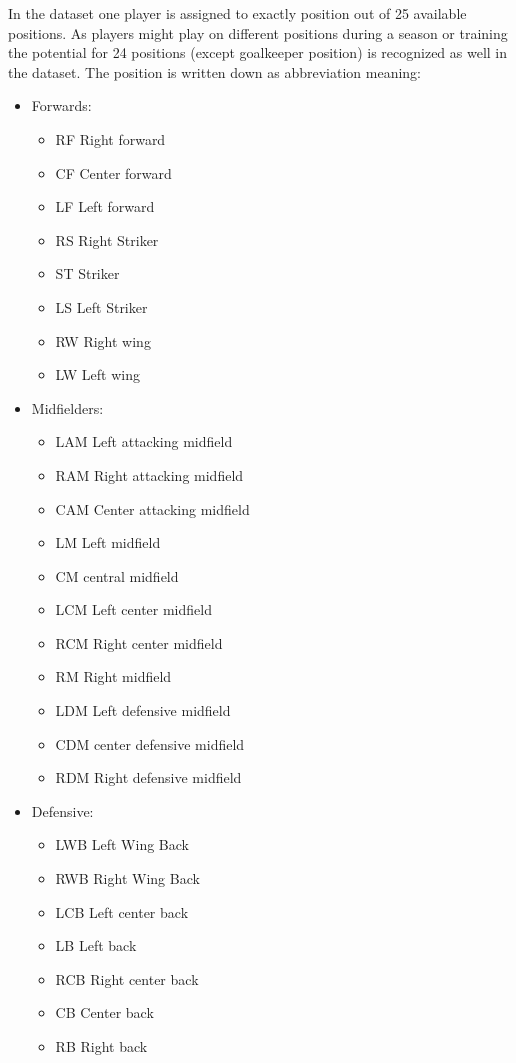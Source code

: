 In the dataset one player is assigned to exactly position out of 25 available positions. As players might play on different positions during a season or training the potential for 24 positions (except goalkeeper position) is recognized as well in the dataset. The position is written down as abbreviation meaning:
\setlength{\columnseprule}{0.4pt}
\begin{multicols}{3}
\begin{itemize}
\item	Forwards:
\begin{itemize}
\item	RF Right forward
\item	CF Center forward
\item	LF Left forward
\item	RS Right Striker
\item	ST Striker
\item	LS Left Striker
\item	RW Right wing
\item	LW Left wing 
\end{itemize}
\item	Midfielders:
\begin{itemize}
\item	LAM Left attacking midfield
\item	RAM Right attacking midfield
\item	CAM Center attacking midfield
\item	LM Left midfield
\item	CM central midfield
\item	LCM Left center midfield
\item	RCM Right center midfield
\item	RM Right midfield
\item	LDM Left defensive midfield
\item	CDM center defensive midfield
\item	RDM Right defensive midfield
\columnbreak
\end{itemize}
\item	Defensive: 
\begin{itemize}
\item	LWB Left Wing Back
\item	RWB Right Wing Back
\item	LCB Left center back 
\item	LB Left back
\item	RCB Right center back
\item	CB Center back
\item	RB Right back
\end{itemize}
\end{itemize}
\end{multicols}
